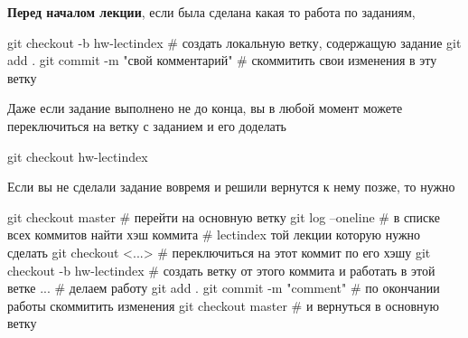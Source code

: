{\bf Перед началом лекции}, если была сделана какая то работа по заданиям,
\begin{shelloutput}
git checkout -b hw-lect{index}      # создать локальную ветку, содержащую задание
git add .
git commit -m "{свой комментарий}"  # скоммитить свои изменения в эту ветку
\end{shelloutput}

Даже если задание выполнено не до конца, вы в любой момент можете переключиться на ветку с заданием и его доделать
\begin{shelloutput}
git checkout hw-lect{index}
\end{shelloutput}

Если вы не сделали задание вовремя и решили вернутся к нему позже, то нужно
\begin{shelloutput}
git checkout master            # перейти на основную ветку
git log --oneline              # в списке всех коммитов найти хэш коммита
                               # lect{index} той лекции которую нужно сделать
git checkout <...>             # переключиться на этот коммит по его хэшу
git checkout -b hw-lect{index} # создать ветку от этого коммита и работать в этой ветке
...                            # делаем работу
git add .
git commit -m "comment"        # по окончании работы скоммитить изменения
git checkout master            # и вернуться в основную ветку
\end{shelloutput}

